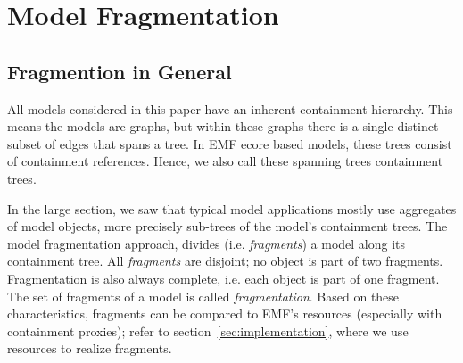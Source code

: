 \section{Model Fragmentation}

\subsection{Fragmention in General}
All models considered in this paper have an inherent containment hierarchy. This means the models are graphs, but within these graphs there is a single distinct subset of edges that spans a tree. In EMF ecore based models, these trees consist of containment references. Hence, we also call these spanning trees containment trees.

In the large section, we saw that typical model applications mostly use aggregates of model objects, more precisely sub-trees of the model's containment trees. The model fragmentation approach, divides (i.e. \emph{fragments}) a model along its containment tree. All \emph{fragments} are disjoint; no object is part of two fragments. Fragmentation is also always complete, i.e. each object is part of one fragment. The set of fragments of a model is called \emph{fragmentation}. Based on these characteristics, fragments can be compared to EMF's resources (especially with containment proxies); refer to section~\ref{sec:implementation}, where we use resources to realize fragments.

